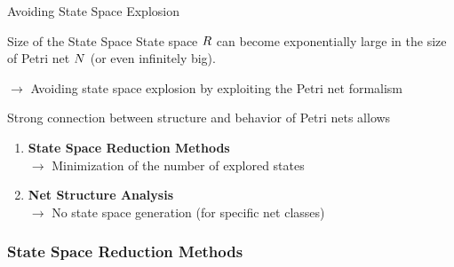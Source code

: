 \documentclass[11pt]{presentation}
\begin{document}
\begin{frame}{Avoiding State Space Explosion}
	\begin{merke}{Size of the State Space}{}
		State space $ \ss $ can become exponentially large in the size of Petri net $ \pn $ (or even infinitely big).
	\end{merke}

	$ \rightarrow $ Avoiding state space explosion by exploiting the Petri net formalism

	\bigskip
	Strong connection between structure and behavior of Petri nets allows

	\medskip

	\begin{enumerate}
		\item \textbf{State Space Reduction Methods} \\
		      $ \rightarrow $ Minimization of the number of explored states
		\item \textbf{Net Structure Analysis} \\
		      $ \rightarrow $ No state space generation
		      (for specific net classes)
	\end{enumerate}
\end{frame}

\subsubsection{State Space Reduction Methods}

\end{document}

